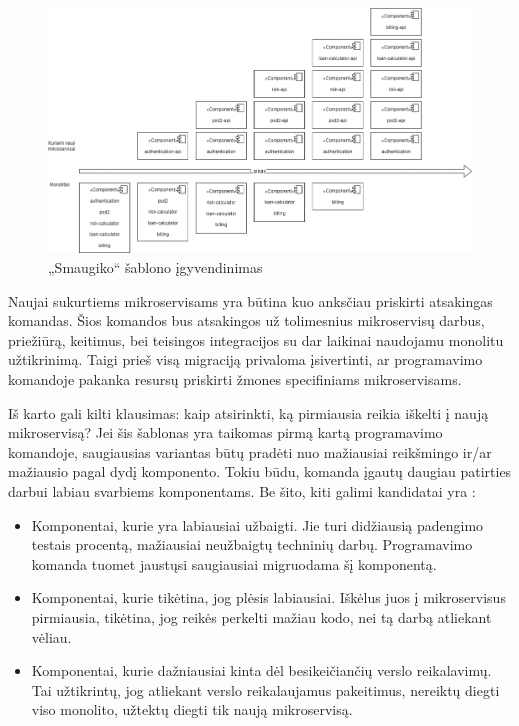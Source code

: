 \documentclass[fleqn]{VUMIFPSkursinis}
\begin{document}
\begin{figure}[H]
    \centering
    \includegraphics{img/smaugiko-sablonas.png}
    \caption{„Smaugiko“ šablono įgyvendinimas}
    \label{img:smaugiko-sablonas}
\end{figure}

Naujai sukurtiems mikroservisams yra būtina kuo anksčiau priskirti atsakingas komandas. Šios komandos bus atsakingos už tolimesnius mikroservisų darbus, priežiūrą, keitimus, bei teisingos integracijos su dar laikinai naudojamu monolitu užtikrinimą. Taigi prieš visą migraciją privaloma įsivertinti, ar programavimo komandoje pakanka resursų priskirti žmones specifiniams mikroservisams.

Iš karto gali kilti klausimas: kaip atsirinkti, ką pirmiausia reikia iškelti į naują mikroservisą? Jei šis šablonas yra taikomas pirmą kartą programavimo komandoje, saugiausias variantas būtų pradėti nuo mažiausiai reikšmingo ir/ar mažiausio pagal dydį komponento. Tokiu būdu, komanda įgautų daugiau patirties darbui labiau svarbiems komponentams. Be šito, kiti galimi kandidatai yra \cite{Beh18}:
\begin{itemize}
    \item Komponentai, kurie yra labiausiai užbaigti. Jie turi didžiausią padengimo testais procentą, mažiausiai neužbaigtų techninių darbų. Programavimo komanda tuomet jaustųsi saugiausiai migruodama šį komponentą.
    
    \item Komponentai, kurie tikėtina, jog plėsis labiausiai. Iškėlus juos į mikroservisus pirmiausia, tikėtina, jog reikės perkelti mažiau kodo, nei tą darbą atliekant vėliau.
    
    \item Komponentai, kurie dažniausiai kinta dėl besikeičiančių verslo reikalavimų. Tai užtikrintų, jog atliekant verslo reikalaujamus pakeitimus, nereiktų diegti viso monolito, užtektų diegti tik naują mikroservisą.\\
\end{itemize}
\end{document}
